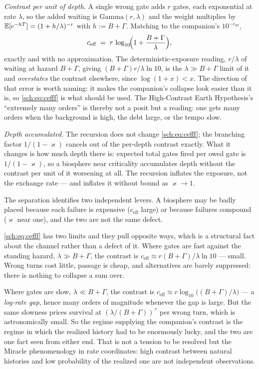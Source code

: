 \emph{Contrast per unit of depth.} A single wrong gate adds $r$ gates,
each exponential at rate $\lambda$, so the added waiting is
$\mathrm{Gamma}(r,\lambda)$ and the weight multiplies by
$\mathbb{E}[e^{-hT}]=(1+h/\lambda)^{-r}$ with $h:=B+\Gamma$. Matching to the
companion's $10^{-c_{\mathrm{eff}}}$,
\begin{equation}\label{sch:eq:cefff}
c_{\mathrm{eff}}\;=\;r\,\log_{10}\!\Bigl(1+\frac{B+\Gamma}{\lambda}\Bigr),
\end{equation}
exactly and with no approximation. The deterministic-exposure reading, $r/\lambda$ of waiting at hazard $B+\Gamma$, giving
$(B+\Gamma)r/\lambda\ln10$, is the $\lambda\gg B+\Gamma$ limit of it
and \emph{overstates} the contrast elsewhere, since $\log(1+x)<x$. The
direction of that error is worth naming: it makes the companion's
collapse look easier than it is, so \eqref{sch:eq:cefff} is what should
be used. The High-Contrast Earth
Hypothesis's ``extremely many orders'' is thereby not a posit but a
reading: one gets many orders when the background is high, the debt
large, or the tempo slow.

\emph{Depth accumulated.} The recursion does not change
\eqref{sch:eq:cefff}; the branching factor $1/(1-\varkappa)$ cancels out of the
per-depth contrast exactly. What it changes is how much depth there is:
expected total gates fired per owed gate is $1/(1-\varkappa)$, so a biosphere
near criticality accumulates depth without the contrast per unit of it
worsening at all. The recursion inflates the exposure, not the exchange
rate --- and inflates it without bound as $\varkappa\to1$.

The separation identifies two independent levers. A biosphere may be
badly placed because each failure is expensive ($c_{\mathrm{eff}}$
large) or because failures compound ($\varkappa$ near one), and the two are not
the same defect.

\begin{remark}
\label{sch:rem:tension}
\eqref{sch:eq:cefff} has two limits and they pull opposite ways, which
is a structural fact about the channel rather than a defect of it. Where gates are fast against the standing hazard, $\lambda\gg B+\Gamma$,
the contrast is $c_{\mathrm{eff}}\approx r(B+\Gamma)/\lambda\ln10$ ---
small. Wrong turns cost little, passage is cheap, and alternatives are
barely suppressed: there is nothing to collapse a sum over.

Where gates are slow, $\lambda\ll B+\Gamma$, the contrast is
$c_{\mathrm{eff}}\approx r\log_{10}\bigl((B+\Gamma)/\lambda\bigr)$ --- a
\emph{log-rate gap}, hence many orders of magnitude whenever the gap is
large. But the same slowness prices survival at
$(\lambda/(B+\Gamma))^{\,r}$ per wrong turn, which is astronomically
small. So the regime supplying the companion's contrast is the regime in which
the realized history had to be enormously lucky, and the two are one
fact seen from either end. That is not a tension to be resolved but the
Miracle phenomenology in rate coordinates: high contrast between natural
histories and low probability of the realized one are not independent
observations.
\end{remark}

